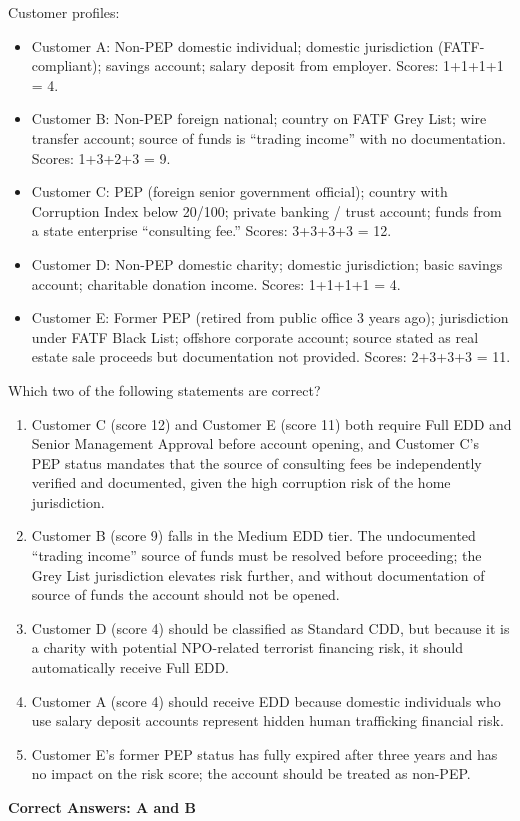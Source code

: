 \documentclass[11pt,a4paper]{article}
\begin{document}
	Customer profiles:
	\begin{itemize}
		\item Customer A: Non-PEP domestic individual; domestic jurisdiction (FATF-compliant); savings account; salary deposit from employer. Scores: 1+1+1+1 = 4.
		\item Customer B: Non-PEP foreign national; country on FATF Grey List; wire transfer account; source of funds is ``trading income'' with no documentation. Scores: 1+3+2+3 = 9.
		\item Customer C: PEP (foreign senior government official); country with Corruption Index below 20/100; private banking / trust account; funds from a state enterprise ``consulting fee.'' Scores: 3+3+3+3 = 12.
		\item Customer D: Non-PEP domestic charity; domestic jurisdiction; basic savings account; charitable donation income. Scores: 1+1+1+1 = 4.
		\item Customer E: Former PEP (retired from public office 3 years ago); jurisdiction under FATF Black List; offshore corporate account; source stated as real estate sale proceeds but documentation not provided. Scores: 2+3+3+3 = 11.
	\end{itemize}
	
	Which two of the following statements are correct?
	
	\begin{enumerate}[label=\Alph*.]
		\item Customer C (score 12) and Customer E (score 11) both require Full EDD and Senior Management Approval before account opening, and Customer C's PEP status mandates that the source of consulting fees be independently verified and documented, given the high corruption risk of the home jurisdiction.
		\item Customer B (score 9) falls in the Medium EDD tier. The undocumented ``trading income'' source of funds must be resolved before proceeding; the Grey List jurisdiction elevates risk further, and without documentation of source of funds the account should not be opened.
		\item Customer D (score 4) should be classified as Standard CDD, but because it is a charity with potential NPO-related terrorist financing risk, it should automatically receive Full EDD.
		\item Customer A (score 4) should receive EDD because domestic individuals who use salary deposit accounts represent hidden human trafficking financial risk.
		\item Customer E's former PEP status has fully expired after three years and has no impact on the risk score; the account should be treated as non-PEP.
	\end{enumerate}
	\textbf{Correct Answers: A and B}
	
\end{document}
